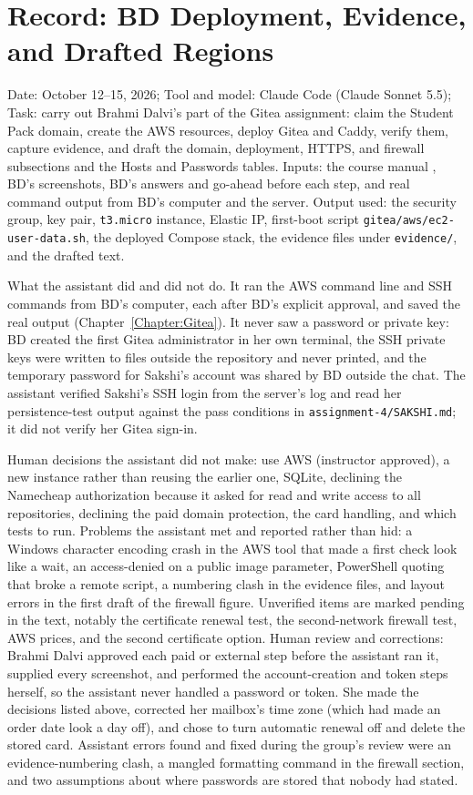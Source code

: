 \section{Record: BD Deployment, Evidence, and Drafted Regions}
Date: October 12--15, 2026; Tool and model: Claude Code (Claude Sonnet 5.5);
Task: carry out Brahmi Dalvi's part of the Gitea assignment: claim the Student
Pack domain, create the AWS resources, deploy Gitea and Caddy, verify them,
capture evidence, and draft the domain, deployment, HTTPS, and firewall
subsections and the Hosts and Passwords tables. Inputs: the course manual
\cite{DosManual}, BD's screenshots, BD's answers and go-ahead before each step,
and real command output from BD's computer and the server. Output used: the
security group, key pair, \texttt{t3.micro} instance, Elastic IP, first-boot
script \texttt{gitea/aws/ec2-user-data.sh}, the deployed Compose stack, the
evidence files under \texttt{evidence/}, and the drafted text.

What the assistant did and did not do. It ran the AWS command line and SSH
commands from BD's computer, each after BD's explicit approval, and saved
the real output (Chapter~\ref{Chapter:Gitea}). It never saw a password or
private key: BD created the first Gitea administrator in her own terminal, the
SSH private keys were written to files outside the repository and never
printed, and the temporary password for Sakshi's account was shared by BD
outside the chat. The assistant verified Sakshi's SSH login from the server's
log and read her persistence-test output against the pass conditions in
\texttt{assignment-4/SAKSHI.md}; it did not verify her Gitea sign-in.

Human decisions the assistant did not make: use AWS (instructor approved), a new
instance rather than reusing the earlier one, SQLite, declining the Namecheap
authorization because it asked for read and write access to all repositories,
declining the paid domain protection, the card handling, and which tests to run.
Problems the assistant met and reported rather than hid: a Windows character
encoding crash in the AWS tool that made a first check look like a wait, an
access-denied on a public image parameter, PowerShell quoting that broke a
remote script, a numbering clash in the evidence files, and layout errors in the
first draft of the firewall figure. Unverified items are marked pending in the
text, notably the certificate renewal test, the second-network firewall test,
AWS prices, and the second certificate option. Human review and corrections:
Brahmi Dalvi approved each paid or external step before the assistant ran it,
supplied every screenshot, and performed the account-creation and token steps
herself, so the assistant never handled a password or token. She made the
decisions listed above, corrected her mailbox's time zone (which had made an
order date look a day off), and chose to turn automatic renewal off and delete the
stored card. Assistant errors found and fixed during the group's review were an
evidence-numbering clash, a mangled formatting command in the firewall section,
and two assumptions about where passwords are stored that nobody had stated.
